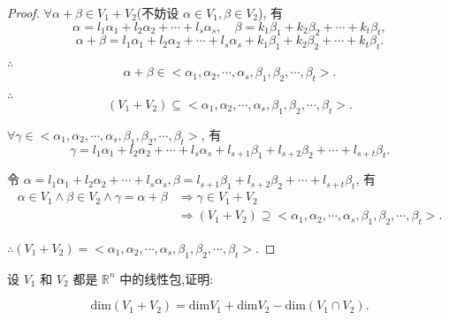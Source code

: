 \documentclass{ctexart}
\begin{document}
\begin{proof}
    $\forall\alpha+\beta\in V_1+V_2$(不妨设 $\alpha\in V_1,\beta\in V_2$), 有
    \[\alpha=l_1\alpha_1+l_2\alpha_2+\cdots+l_s\alpha_s,\quad\beta=k_1\beta_1+k_2\beta_2+\cdots+k_t\beta_t,\]
    \[\alpha+\beta=l_1\alpha_1+l_2\alpha_2+\cdots+l_s\alpha_s+k_1\beta_1+k_2\beta_2+\cdots+k_t\beta_t.\]

    $\therefore$
    \[\alpha+\beta\in<\alpha_1,\alpha_2,\cdots,\alpha_s,\beta_1,\beta_2,\cdots,\beta_t>.\]
    
    $\therefore$
    \[(V_1+V_2)\subseteq<\alpha_1,\alpha_2,\cdots,\alpha_s,\beta_1,\beta_2,\cdots,\beta_t>.\]

    $\forall\gamma\in<\alpha_1,\alpha_2,\cdots,\alpha_s,\beta_1,\beta_2,\cdots,\beta_t>$, 有
    \[\gamma=l_1\alpha_1+l_2\alpha_2+\cdots+l_s\alpha_s+l_{s+1}\beta_1+l_{s+2}\beta_2+\cdots+l_{s+t}\beta_t.\]

    令 $\alpha=l_1\alpha_1+l_2\alpha_2+\cdots+l_s\alpha_s,\beta=l_{s+1}\beta_1+l_{s+2}\beta_2+\cdots+l_{s+t}\beta_t$, 有
    \begin{align*}
        \alpha\in V_1\land\beta\in V_2\land\gamma=\alpha+\beta & \Rightarrow\gamma\in V_1+V_2 \\
        & \Rightarrow(V_1+V_2)\supseteq<\alpha_1,\alpha_2,\cdots,\alpha_s,\beta_1,\beta_2,\cdots,\beta_t>.
    \end{align*}

    $\therefore(V_1+V_2)=<\alpha_1,\alpha_2,\cdots,\alpha_s,\beta_1,\beta_2,\cdots,\beta_t>.$
\end{proof}
\begin{exercise}[1.7,有改动]\label{ex1.7}
设 $V_1$ 和 $V_2$ 都是 $\mathbb{R}^n$ 中的线性包,证明:

$$\mathrm{dim}(V_1+V_2)=\mathrm{dim}V_1+\mathrm{dim}V_2-\mathrm{dim}(V_1\cap V_2).$$
\end{exercise}
\end{document}
